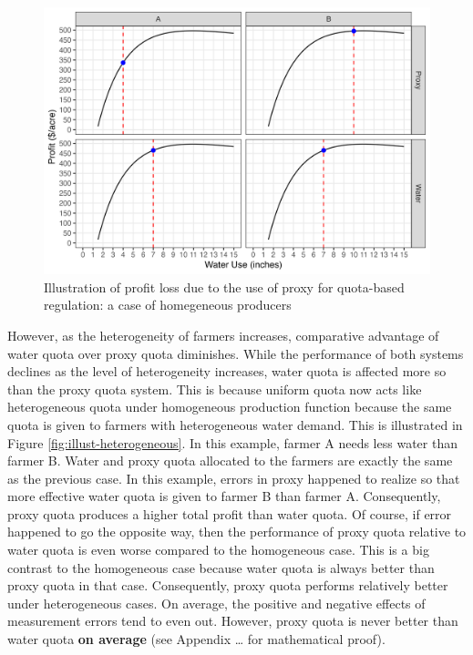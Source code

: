 \documentclass[
]{article}
\begin{document}
\begin{figure}[H]

{\centering \includegraphics{figures/g_illustration_homogeneous} 

}

\caption{Illustration of profit loss due to the use of proxy for quota-based regulation: a case of homegeneous producers}\label{fig:illust-homegeneous}
\end{figure}

However, as the heterogeneity of farmers increases, comparative advantage of water quota over proxy quota diminishes. While the performance of both systems declines as the level of heterogeneity increases, water quota is affected more so than the proxy quota system. This is because uniform quota now acts like heterogeneous quota under homogeneous production function because the same quota is given to farmers with heterogeneous water demand. This is illustrated in Figure \ref{fig:illust-heterogeneous}. In this example, farmer A needs less water than farmer B. Water and proxy quota allocated to the farmers are exactly the same as the previous case. In this example, errors in proxy happened to realize so that more effective water quota is given to farmer B than farmer A. Consequently, proxy quota produces a higher total profit than water quota. Of course, if error happened to go the opposite way, then the performance of proxy quota relative to water quota is even worse compared to the homogeneous case. This is a big contrast to the homogeneous case because water quota is always better than proxy quota in that case. Consequently, proxy quota performs relatively better under heterogeneous cases. On average, the positive and negative effects of measurement errors tend to even out. However, proxy quota is never better than water quota \textbf{on average} (see Appendix \ldots{} for mathematical proof).
\end{document}
